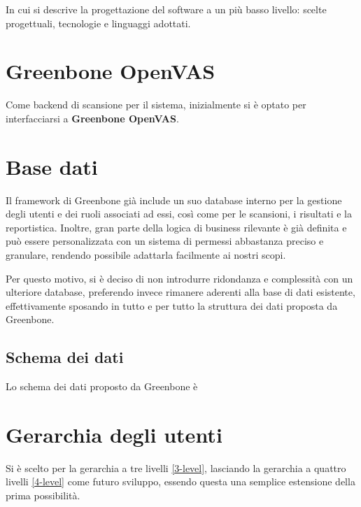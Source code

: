 In cui si descrive la progettazione del software a un più basso livello: scelte progettuali, tecnologie e linguaggi adottati.

\section{Greenbone OpenVAS}
Come backend di scansione per il sistema, inizialmente si è optato per interfacciarsi a \textbf{Greenbone OpenVAS}.

\section{Base dati}
Il framework di Greenbone già include un suo database interno per la gestione degli utenti e dei ruoli associati ad essi, così come per le scansioni, i risultati e la reportistica. Inoltre, gran parte della logica di business rilevante è già definita e può essere personalizzata con un sistema di permessi abbastanza preciso e granulare, rendendo possibile adattarla facilmente ai nostri scopi.

Per questo motivo, si è deciso di non introdurre ridondanza e complessità con un ulteriore database, preferendo invece rimanere aderenti alla base di dati esistente, effettivamente sposando in tutto e per tutto la struttura dei dati proposta da Greenbone.

\subsection{Schema dei dati}
Lo schema dei dati proposto da Greenbone è 

\section{Gerarchia degli utenti}
Si è scelto per la gerarchia a tre livelli \ref{3-level}, lasciando la gerarchia a quattro livelli \ref{4-level} come futuro sviluppo, essendo questa una semplice estensione della prima possibilità.